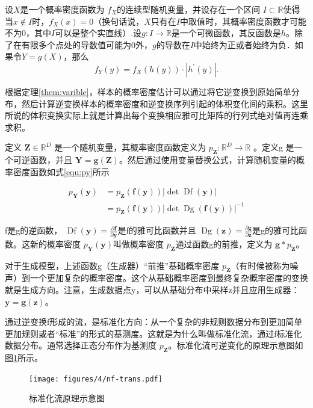 \begin{them}[变量替换公式]\label{them:varible}
设$X$是一个概率密度函数为 $f_{X}$的连续型随机变量，并设存在一个区间 $I \subset \mathbb{R}$使得当$x \notin I$时，$f_{X}(x)=0$（换句话说，$X$只有在$I$中取值时，其概率密度函数才可能不为0，其中$I$可以是整个实直线）.设$g: I \rightarrow \mathbb{R}$是一个可微函数，其反函数是$h$。除了在有限多个点处的导数值可能为0外，$g$的导数在$I$中始终为正或者始终为负．如果令$Y=g(X)$，那么
$$
f_{Y}(y)=f_{X}(h(y)) \cdot\left|h^{\prime}(y)\right| .
$$
\end{them}

根据定理\ref{them:varible}，样本的概率密度估计可以通过将它逆变换到原始简单分布，然后计算逆变换样本的概率密度和逆变换序列引起的体积变化间的乘积。这里所说的体积变换实际上就是计算出每个变换相应雅可比矩阵的行列式绝对值再连乘求积。\cite{kobyzevNormalizingFlowsIntroduction2021}

定义 $\mathbf{Z} \in \mathbb{R}^{D}$ 是一个随机变量，其概率密度函数定义为 $p_{\mathbf{Z}}: \mathbb{R}^{D} \rightarrow \mathbb{R}$ 。定义g 是一个可逆函数，并且 $\mathbf{Y}=\mathbf{g}(\mathbf{Z})$。然后通过使用变量替换公式，计算随机变量的概 率密度函数如式\ref{equ:py}所示

\begin{equation}\label{equ:py}
    \begin{aligned}p_{\mathbf{Y}}(\mathbf{y}) & =p_{\mathbf{Z}}(\mathbf{f}(\mathbf{y}))|\operatorname{det} \operatorname{Df}(\mathbf{y})| \\& =p_{\mathbf{Z}}(\mathbf{f}(\mathbf{y}))|\operatorname{det} \operatorname{Dg}(\mathbf{f}(\mathbf{y}))|^{-1} \end{aligned}
\end{equation}

f是g的逆函数， $\operatorname{Df}(\mathbf{y})=\frac{\partial \mathbf{f}}{\partial \mathbf{y}}$是f的雅可比函数并且 $\operatorname{Dg}(\mathbf{z})=\frac{\partial \mathbf{g}}{\partial \mathbf{z}}$是g的雅可比函数。这新的概率密度 $p_{\mathbf{Y}}(\mathbf{y})$叫做概率密度 $p_{\mathbf{Z}}$通过函数g的前推，定义为 $\mathbf{g}{*} p_{\mathbf{Z}}$。

对于生成模型，上述函数g（生成器）“前推”基础概率密度 $p_{\mathbf{Z}}$（有时候被称为噪声）到一个更加复杂的概率密度。这个从基础概率密度到最终复杂概率密度的变换就是生成方向。注意，生成数据点y，可以从基础分布中采样z并且应用生成器： $\mathbf{y}=\mathbf{g}(\mathbf{z})$。

通过逆变换f形成的流，是标准化方向：从一个复杂的非规则数据分布到更加简单更加规则或者“标准”的形式的基测度。这就是为什么叫做标准化流，通过f标准化数据分布。通常选择正态分布作为基测度 $p_{\mathbf{Z}}$。标准化流可逆变化的原理示意图如图\ref{fig:nf-trans}所示。
\begin{figure}[htbp]
    \centering
    \texttt{[image: figures/4/nf-trans.pdf]}
    \caption{标准化流原理示意图}
    \label{fig:nf-trans}
\end{figure}

